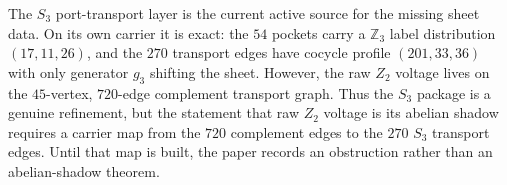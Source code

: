 
\makeatletter
{}
\makeatother
\providecommand{\PSp}{\mathrm{PSp}}
\providecommand{\Aut}{\mathrm{Aut}}
\providecommand{\spec}{\operatorname{spec}}


\begin{remark}
\label{rem:s3-shadow-carrier-obstruction}
The $S_3$ port-transport layer is the current active source for the missing sheet
data.  On its own carrier it is exact: the $54$ pockets carry a $\mathbb Z_3$
label distribution $(17,11,26)$, and the $270$ transport edges have cocycle
profile $(201,33,36)$ with only generator $g_3$ shifting the sheet.  However, the
raw $Z_2$ voltage lives on the $45$-vertex, $720$-edge complement transport
graph.  Thus the $S_3$ package is a genuine refinement, but the statement that
raw $Z_2$ voltage is its abelian shadow requires a carrier map from the $720$
complement edges to the $270$ $S_3$ transport edges.  Until that map is built,
the paper records an obstruction rather than an abelian-shadow theorem.
\end{remark}

